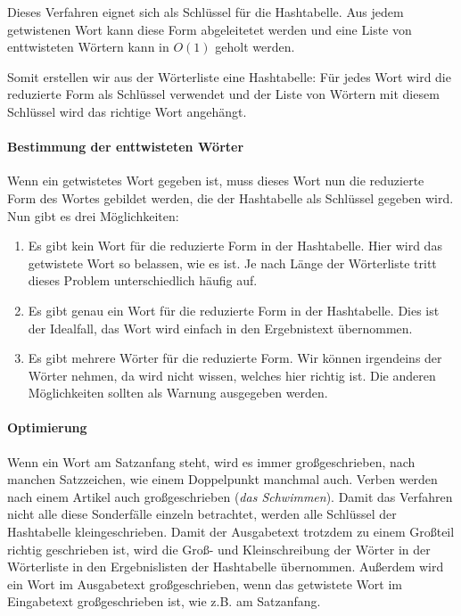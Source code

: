 \documentclass[a4paper,10pt,ngerman]{scrartcl}
\begin{document}
Dieses Verfahren eignet sich als Schlüssel für die Hashtabelle. Aus jedem getwistenen Wort kann diese Form abgeleitetet werden und eine Liste von enttwisteten Wörtern kann in $O(1)$ geholt werden.

Somit erstellen wir aus der Wörterliste eine Hashtabelle: Für jedes Wort wird die reduzierte Form als Schlüssel verwendet und der Liste von Wörtern mit diesem Schlüssel wird das richtige Wort angehängt.

\paragraph{Bestimmung der enttwisteten Wörter}
Wenn ein getwistetes Wort gegeben ist, muss dieses Wort nun die reduzierte Form des Wortes gebildet werden, die der Hashtabelle als Schlüssel gegeben wird. Nun gibt es drei Möglichkeiten:
\begin{enumerate}
  \item Es gibt kein Wort für die reduzierte Form in der Hashtabelle. Hier wird das getwistete Wort so belassen, wie es ist. Je nach Länge der Wörterliste tritt dieses Problem unterschiedlich häufig auf.
  \item Es gibt genau ein Wort für die reduzierte Form in der Hashtabelle. Dies ist der Idealfall, das Wort wird einfach in den Ergebnistext übernommen.
  \item Es gibt mehrere Wörter für die reduzierte Form. Wir können irgendeins der Wörter nehmen, da wird nicht wissen, welches hier richtig ist. Die anderen Möglichkeiten sollten als Warnung ausgegeben werden.
\end{enumerate}

\paragraph{Optimierung}
Wenn ein Wort am Satzanfang steht, wird es immer großgeschrieben, nach manchen Satzzeichen, wie einem Doppelpunkt manchmal auch. Verben werden nach einem Artikel auch großgeschrieben (\textit{das Schwimmen}). Damit das Verfahren nicht alle diese Sonderfälle einzeln betrachtet, werden alle Schlüssel der Hashtabelle kleingeschrieben. Damit der Ausgabetext trotzdem zu einem Großteil richtig geschrieben ist, wird die Groß- und Kleinschreibung der Wörter in der Wörterliste in den Ergebnislisten der Hashtabelle übernommen. Außerdem wird ein Wort im Ausgabetext großgeschrieben, wenn das getwistete Wort im Eingabetext großgeschrieben ist, wie z.B. am Satzanfang.
\end{document}
